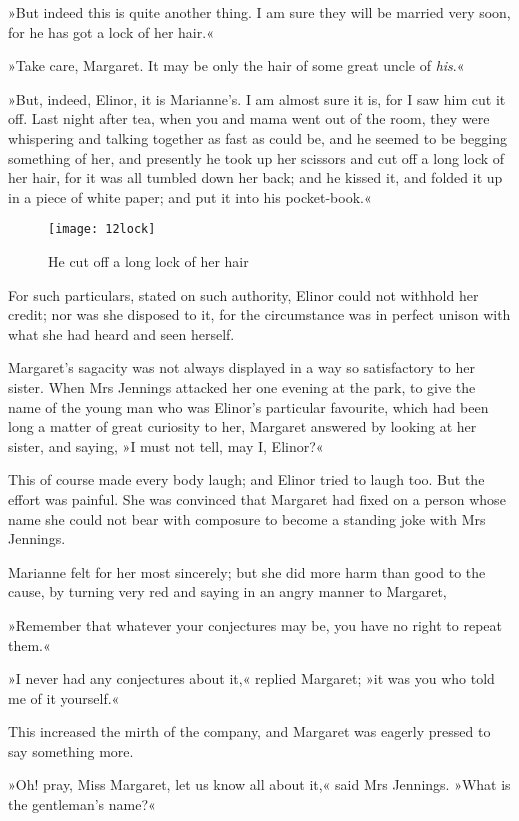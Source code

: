 »But indeed this is quite another thing. I am sure they will be married very soon, for he has got a lock of her hair.«

»Take care, Margaret. It may be only the hair of some great uncle of \textit{his}.«

»But, indeed, Elinor, it is Marianne’s. I am almost sure it is, for I saw him cut it off. Last night after tea, when you and mama went out of the room, they were whispering and talking together as fast as could be, and he seemed to be begging something of her, and presently he took up her scissors and cut off a long lock of her hair, for it was all tumbled down her back; and he kissed it, and folded it up in a piece of white paper; and put it into his pocket-book.«

\begin{figure}[tbph]
\centering
\texttt{[image: 12lock]}
\caption{He cut off a long lock of her hair}
\end{figure}

For such particulars, stated on such authority, Elinor could not withhold her credit; nor was she disposed to it, for the circumstance was in perfect unison with what she had heard and seen herself.

Margaret’s sagacity was not always displayed in a way so satisfactory to her sister. When Mrs Jennings attacked her one evening at the park, to give the name of the young man who was Elinor’s particular favourite, which had been long a matter of great curiosity to her, Margaret answered by looking at her sister, and saying, »I must not tell, may I, Elinor?«

This of course made every body laugh; and Elinor tried to laugh too. But the effort was painful. She was convinced that Margaret had fixed on a person whose name she could not bear with composure to become a standing joke with Mrs Jennings.

Marianne felt for her most sincerely; but she did more harm than good to the cause, by turning very red and saying in an angry manner to Margaret,

»Remember that whatever your conjectures may be, you have no right to repeat them.«

»I never had any conjectures about it,« replied Margaret; »it was you who told me of it yourself.«

This increased the mirth of the company, and Margaret was eagerly pressed to say something more.

»Oh! pray, Miss Margaret, let us know all about it,« said Mrs Jennings. »What is the gentleman’s name?«

